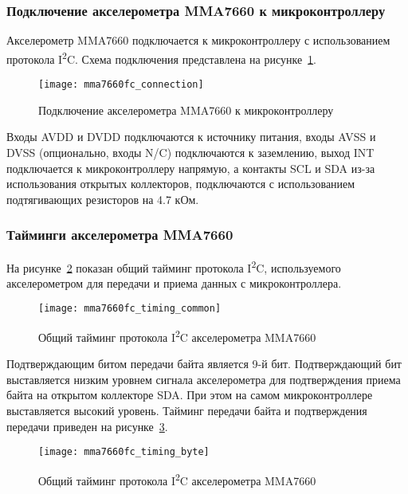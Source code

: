 \documentclass[document.tex]{subfiles}
\begin{document}
\clearpage
\subsubsection{Подключение акселерометра MMA7660 к микроконтроллеру}
Акселерометр MMA7660 подключается к микроконтроллеру с использованием протокола I\textsuperscript{2}C. Схема подключения представлена на рисунке~\ref{fig:mma7660fc_connection}.

\begin{figure}[h]
\centering
\texttt{[image: mma7660fc\_connection]}
\caption{Подключение акселерометра MMA7660 к микроконтроллеру}
\label{fig:mma7660fc_connection}
\end{figure}

Входы AVDD и DVDD подключаются к источнику питания, входы AVSS и DVSS (опцио\-нально, входы N/C) подключаются к заземлению, выход INT подключается к микрокон\-троллеру
напрямую, а контакты SCL и SDA из-за использования открытых коллекторов, подключаются с использованием подтягивающих резисторов на 4.7 кОм.\cite{accelerometer_mma7660, basics}

\clearpage
\subsubsection{Тайминги акселерометра MMA7660}
На рисунке~\ref{fig:mma7660fc_timing_common} показан общий тайминг протокола I\textsuperscript{2}C, используемого акселерометром для передачи и приема данных с микроконтроллера.
\begin{figure}[h]
\centering
\texttt{[image: mma7660fc\_timing\_common]}
\caption{Общий тайминг протокола I\textsuperscript{2}C акселерометра MMA7660}
\label{fig:mma7660fc_timing_common}
\end{figure}

Подтверждающим битом передачи байта является 9-й бит. Подтверждающий бит выстав\-ляется низким уровнем сигнала акселерометра для подтверждения приема байта на открытом коллекторе
SDA. При этом на самом микроконтроллере выставляется высокий уровень. Тайминг передачи байта и подтверждения передачи приведен на
рисунке~\ref{fig:mma7660fc_timing_byte}.\cite{accelerometer_mma7660}

\begin{figure}[h]
\centering
\texttt{[image: mma7660fc\_timing\_byte]}
\caption{Общий тайминг протокола I\textsuperscript{2}C акселерометра MMA7660}
\label{fig:mma7660fc_timing_byte}
\end{figure}
\end{document}
